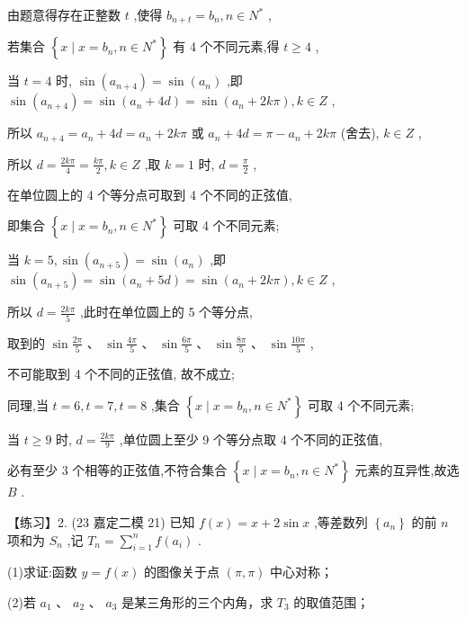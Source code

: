 \documentclass[10pt]{article}
\begin{document}
由题意得存在正整数 \(t\) ,使得 \({b}_{n + t} = {b}_{n},n \in  {N}^{ * }\) ,

若集合 \(\left\{  {x \mid  x = {b}_{n},n \in  {N}^{ * }}\right\}\) 有 4 个不同元素,得 \(t \geq  4\) ,

当 \(t = 4\) 时, \(\sin \left( {a}_{n + 4}\right)  = \sin \left( {a}_{n}\right)\) ,即 \(\sin \left( {a}_{n + 4}\right)  = \sin \left( {{a}_{n} + {4d}}\right)  = \sin \left( {{a}_{n} + {2k\pi }}\right) ,k \in  Z\) ,

所以 \({a}_{n + 4} = {a}_{n} + {4d} = {a}_{n} + {2k\pi }\) 或 \({a}_{n} + {4d} = \pi  - {a}_{n} + {2k\pi }\) (舍去), \(k \in  Z\) ,

所以 \(d = \frac{2k\pi }{4} = \frac{k\pi }{2},k \in  Z\) ,取 \(k = 1\) 时, \(d = \frac{\pi }{2}\) ,

在单位圆上的 4 个等分点可取到 4 个不同的正弦值,

即集合 \(\left\{  {x \mid  x = {b}_{n},n \in  {N}^{ * }}\right\}\) 可取 4 个不同元素;

当 \(k = 5,\sin \left( {a}_{n + 5}\right)  = \sin \left( {a}_{n}\right)\) ,即 \(\sin \left( {a}_{n + 5}\right)  = \sin \left( {{a}_{n} + {5d}}\right)  = \sin \left( {{a}_{n} + {2k\pi }}\right) ,k \in  Z\) ,

所以 \(d = \frac{2k\pi }{5}\) ,此时在单位圆上的 5 个等分点,

取到的 \(\sin \frac{2\pi }{5}\text{ 、 }\sin \frac{4\pi }{5}\text{ 、 }\sin \frac{6\pi }{5}\text{ 、 }\sin \frac{8\pi }{5}\text{ 、 }\sin \frac{10\pi }{5}\) ,

不可能取到 4 个不同的正弦值, 故不成立;

同理,当 \(t = 6,t = 7,t = 8\) ,集合 \(\left\{  {x \mid  x = {b}_{n},n \in  {N}^{ * }}\right\}\) 可取 4 个不同元素;

当 \(t \geq  9\) 时, \(d = \frac{2k\pi }{9}\) ,单位圆上至少 9 个等分点取 4 个不同的正弦值,

必有至少 3 个相等的正弦值,不符合集合 \(\left\{  {x \mid  x = {b}_{n},n \in  {N}^{ * }}\right\}\) 元素的互异性,故选 \(B\) .

【练习】2. (23 嘉定二模 21) 已知 \(f\left( x\right)  = x + 2\sin x\) ,等差数列 \(\left\{  {a}_{n}\right\}\) 的前 \(n\) 项和为 \({S}_{n}\) ,记 \({T}_{n} = \mathop{\sum }\limits_{{i = 1}}^{n}f\left( {a}_{i}\right)\) .

(1)求证:函数 \(y = f\left( x\right)\) 的图像关于点 \(\left( {\pi ,\pi }\right)\) 中心对称；

(2)若 \({a}_{1}\) 、 \({a}_{2}\) 、 \({a}_{3}\) 是某三角形的三个内角，求 \({T}_{3}\) 的取值范围；
\end{document}
